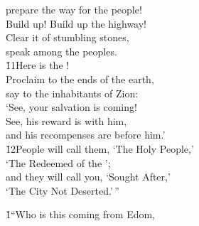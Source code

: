 \begin{poetry}
\poemll    prepare the way for the people! \\
\poeml Build up! Build up the highway! \\
\poemll    Clear it of stumbling stones, \\
\poemlll       speak among the peoples. \\
\poeml \v{11}Here is the ! \\
\poemll    Proclaim to the ends of the earth, \\
\poeml say to the inhabitants of Zion: \\
\poemll    `See, your salvation is coming! \\
\poeml See, his reward is with him, \\
\poemll    and his recompenses are before him.' \\
\poeml \v{12}People will call them, `The Holy People,' \\
\poemll    `The Redeemed of the '; \\
\poeml and they will call you, `Sought After,' \\
\poemll    `The City Not Deserted.'\,''
\end{poetry}

\v{1}``Who is this coming from Edom,

